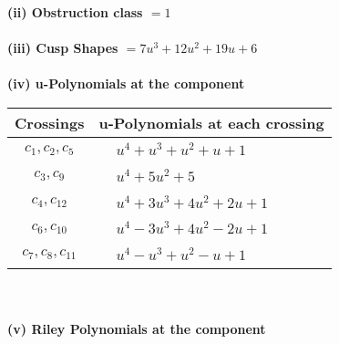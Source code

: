 \documentclass[1p]{elsarticle_modified}
\theoremstyle{definition}
\begin{document}
\flushleft \textbf{(ii) Obstruction class $= 1$}\\~\\
\flushleft \textbf{(iii) Cusp Shapes $= 7 u^3+12 u^2+19 u+6$}\\~\\
\newpage\renewcommand{\arraystretch}{1}
\flushleft \textbf{(iv) u-Polynomials at the component}\newline \\
\begin{tabular}{m{50pt}|m{274pt}}
Crossings & \hspace{64pt}u-Polynomials at each crossing \\
\hline $$\begin{aligned}c_{1},c_{2},c_{5}\end{aligned}$$&$\begin{aligned}
&u^4+u^3+u^2+u+1
\end{aligned}$\\
\hline $$\begin{aligned}c_{3},c_{9}\end{aligned}$$&$\begin{aligned}
&u^4+5 u^2+5
\end{aligned}$\\
\hline $$\begin{aligned}c_{4},c_{12}\end{aligned}$$&$\begin{aligned}
&u^4+3 u^3+4 u^2+2 u+1
\end{aligned}$\\
\hline $$\begin{aligned}c_{6},c_{10}\end{aligned}$$&$\begin{aligned}
&u^4-3 u^3+4 u^2-2 u+1
\end{aligned}$\\
\hline $$\begin{aligned}c_{7},c_{8},c_{11}\end{aligned}$$&$\begin{aligned}
&u^4- u^3+u^2- u+1
\end{aligned}$\\
\hline
\end{tabular}\\~\\
\newpage\renewcommand{\arraystretch}{1}
\flushleft \textbf{(v) Riley Polynomials at the component}\newline \\
\end{document}
